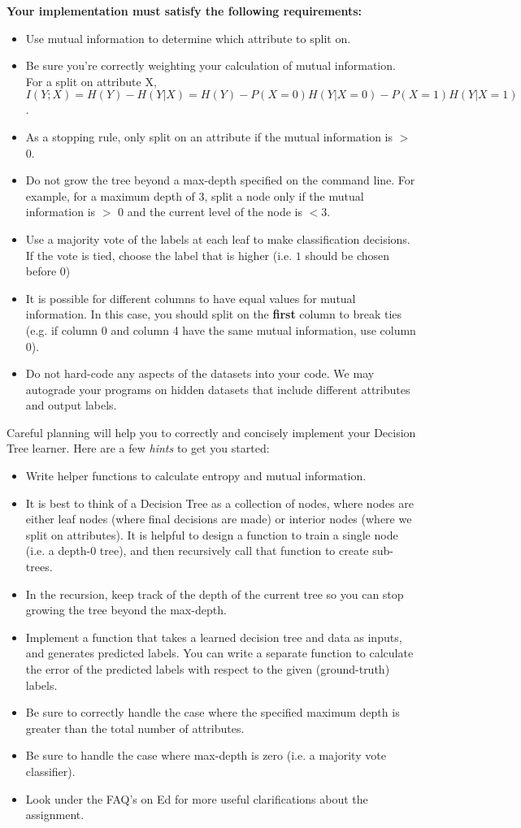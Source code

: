 \documentclass[11pt,addpoints,answers]{exam}
\begin{document}
\textbf{Your implementation must satisfy the following requirements:}
\begin{itemize}
\item Use mutual information to determine which attribute to split on.
\item Be sure you’re correctly weighting your calculation of mutual information. For a split on attribute X, $I(Y;X) = H(Y)-H(Y|X) = H(Y) - P(X=0)H(Y|X = 0) - P(X = 1)H(Y|X = 1)$.
\item As a stopping rule, only split on an attribute if the mutual information is $>$ 0. 
\item Do not grow the tree beyond a max-depth specified on the command line. For example, for a maximum depth of 3, split a node only if the mutual information is $>$ 0 and the current level of the node is $< 3$.
\item Use a majority vote of the labels at each leaf to make classification decisions. If the vote is tied, choose the label that is higher (i.e. $1$ should be chosen before $0$)
\item It is possible for different columns to have equal values for mutual information. In this case, you should split on the \textbf{first} column to break ties (e.g. if column 0 and column 4 have the same mutual information, use column 0).
\item Do not hard-code any aspects of the datasets into your code. We may autograde your programs on hidden datasets that include different attributes and output labels.
\end{itemize}

Careful planning will help you to correctly and concisely implement your Decision Tree learner. Here are a few \emph{hints} to get you started:
\begin{itemize}
    \item Write helper functions to calculate entropy and mutual information.
    \item It is best to think of a Decision Tree as a collection of nodes, where nodes are either leaf nodes (where final decisions are made) or interior nodes (where we split on attributes). It is helpful to design a function to train a single node (i.e. a depth-0 tree), and then recursively call that function to create sub-trees.
    \item In the recursion, keep track of the depth of the current tree so you can stop growing the tree beyond the max-depth.
    \item Implement a function that takes a learned decision tree and data as inputs, and generates predicted labels. You can write a separate function to calculate the error of the predicted labels with respect to the given (ground-truth) labels.
    \item Be sure to correctly handle the case where the specified maximum depth is greater than the total number of attributes.
    \item Be sure to handle the case where max-depth is zero (i.e. a majority vote classifier). 
    \item Look under the FAQ's on Ed for more useful clarifications about the assignment.
\end{itemize}
\end{document}
